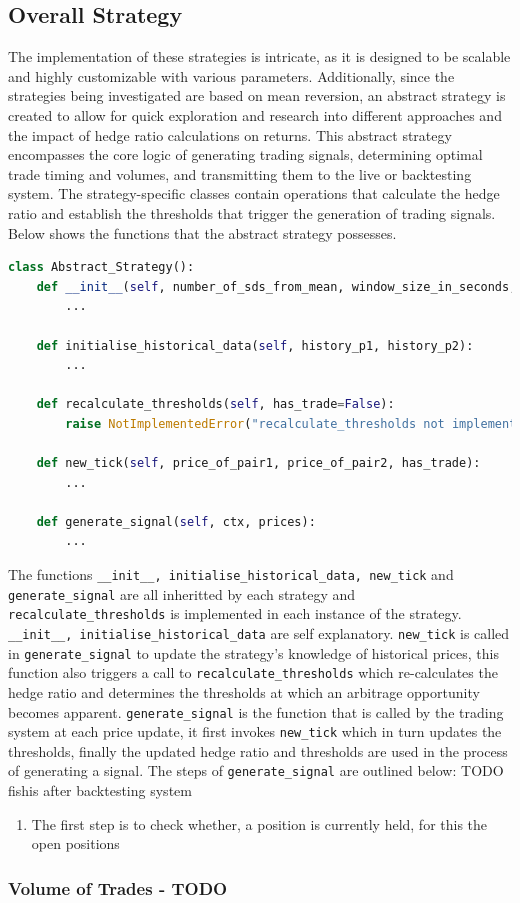 \subsection{Overall Strategy}
The implementation of these strategies is intricate, as it is designed to be scalable and highly customizable with various parameters. Additionally, since the strategies being investigated are based on mean reversion, an abstract strategy is created to allow for quick exploration and research into different approaches and the impact of hedge ratio calculations on returns. This abstract strategy encompasses the core logic of generating trading signals, determining optimal trade timing and volumes, and transmitting them to the live or backtesting system. The strategy-specific classes contain operations that calculate the hedge ratio and establish the thresholds that trigger the generation of trading signals. Below shows the functions that the abstract strategy possesses.
\vspace{5mm}
\begin{lstlisting}[language=Python]
class Abstract_Strategy():
    def __init__(self, number_of_sds_from_mean, window_size_in_seconds, percent_to_invest, strategy_name, gas_price_threshold, rebalance_threshold_as_percent_of_initial_investment):
        ...

    def initialise_historical_data(self, history_p1, history_p2):
        ...

    def recalculate_thresholds(self, has_trade=False):
        raise NotImplementedError("recalculate_thresholds not implemented")

    def new_tick(self, price_of_pair1, price_of_pair2, has_trade):
        ...

    def generate_signal(self, ctx, prices):
        ...

\end{lstlisting}
\vspace{5mm}

The functions \texttt{\_\_init\_\_,\ initialise\_historical\_data,\ new\_tick} and \texttt{generate\_signal} are all inheritted by each strategy and \texttt{recalculate\_thresholds} is implemented in each instance of the strategy. \texttt{\_\_init\_\_,\ initialise\_historical\_data} are self explanatory. \texttt{new\_tick} is called in \texttt{generate\_signal} to update the strategy's knowledge of historical prices, this function also triggers a call to \texttt{recalculate\_thresholds} which re-calculates the hedge ratio and determines the thresholds at which an arbitrage opportunity becomes apparent. \texttt{generate\_signal} is the function that is called by the trading system at each price update, it first invokes \texttt{new\_tick} which in turn updates the thresholds, finally the updated hedge ratio and thresholds are used in the process of generating a signal. The steps of \texttt{generate\_signal} are outlined below: TODO fishis after backtesting system
\begin{enumerate}
    \item The first step is to check whether, a position is currently held, for this the open positions

\end{enumerate}

\subsubsection{Volume of Trades - TODO}

